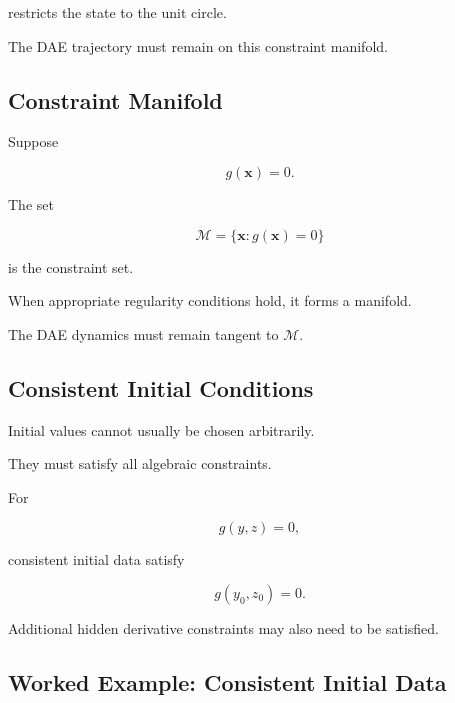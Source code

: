 restricts the state to the unit circle.

The DAE trajectory must remain on this constraint manifold.

\subsection{Constraint Manifold}
\label{subsec:constraint-manifold-dae}

Suppose

\[
\boxed{
g(\mathbf{x})=0.
}
\]

The set

\[
\boxed{
\mathcal{M}
=
\{
\mathbf{x}:
g(\mathbf{x})=0
\}
}
\]

is the constraint set.

When appropriate regularity conditions hold, it forms a manifold.

The DAE dynamics must remain tangent to \(\mathcal{M}\).

\subsection{Consistent Initial Conditions}
\label{subsec:consistent-initial-conditions-dae}

Initial values cannot usually be chosen arbitrarily.

They must satisfy all algebraic constraints.

For

\[
g(y,z)=0,
\]

consistent initial data satisfy

\[
\boxed{
g(y_0,z_0)=0.
}
\]

Additional hidden derivative constraints may also need to be satisfied.

\subsection{Worked Example: Consistent Initial Data}
\label{subsec:worked-consistent-initial-data}

